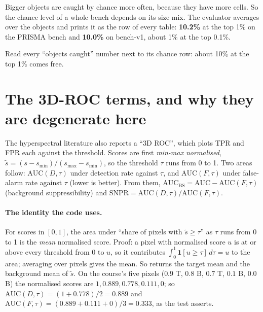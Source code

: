 Bigger objects are caught by chance more often, because they have more cells. So the chance level of a whole bench
depends on its size mix. The evaluator averages  over the objects and prints it as the
 row of every table: \textbf{10.2\%} at the top 1\% on the PRISMA bench and \textbf{10.0\%} on
bench-v1\hfil{}\hfilneg{}, about 1\% at the top 0.1\%.

\begin{keypoint}
Read every ``objects caught'' number next to its chance row: about 10\% at the top 1\% comes free.
\end{keypoint}

\section{The 3D-ROC terms, and why they are degenerate here}\label{sec:measures:3d}

The hyperspectral literature also reports a ``3D ROC'', which plots TPR and FPR each against the threshold. Scores are
first \emph{min-max normalised}, $\tilde s = (s - s_{\min})/(s_{\max} - s_{\min})$, so the threshold $\tau$ runs from
0 to 1. Two areas follow: $\mathrm{AUC}(D, \tau)$ under detection rate against $\tau$, and $\mathrm{AUC}(F, \tau)$
under false-alarm rate against $\tau$ (lower is better). From them, $\mathrm{AUC}_{\mathrm{BS}} =
\mathrm{AUC} - \mathrm{AUC}(F,\tau)$ (background suppressibility) and $\mathrm{SNPR} = \mathrm{AUC}(D,\tau) /
\mathrm{AUC}(F,\tau)$.

\paragraph{The identity the code uses.} For scores in $[0, 1]$, the area under ``share of pixels with $\tilde s \ge
\tau$'' as $\tau$ runs from 0 to 1 is the \emph{mean} normalised score. Proof: a pixel with normalised score $u$ is at
or above every threshold from 0 to $u$, so it contributes $\int_0^1 \mathbf{1}[u \ge \tau]\,d\tau = u$ to the area;
averaging over pixels gives the mean. So  returns the target mean and the background mean of
$\tilde s$. On the course's five pixels ($0.9$ T, $0.8$ B, $0.7$ T, $0.1$ B, $0.0$ B) the normalised scores are
$1, 0.889, 0.778, 0.111, 0$; so $\mathrm{AUC}(D,\tau) = (1 + 0.778)/2 = 0.889$ and $\mathrm{AUC}(F,\tau) = (0.889 +
0.111 + 0)/3 = 0.333$, as the test asserts.

